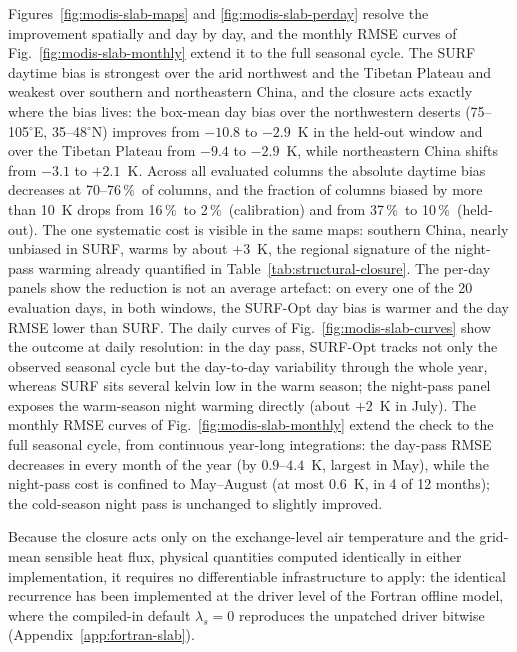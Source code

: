 Figures~\ref{fig:modis-slab-maps} and \ref{fig:modis-slab-perday} resolve
the improvement spatially and day by day, and the monthly RMSE curves of
Fig.~\ref{fig:modis-slab-monthly} extend it to the full seasonal cycle. The
SURF daytime bias is strongest over the arid northwest and the Tibetan
Plateau and weakest over southern and northeastern China, and the closure
acts exactly where the bias lives: the box-mean day bias over the
northwestern deserts (75--105$^\circ$E, 35--48$^\circ$N) improves from
$-10.8$ to $-2.9$~K in the held-out window and over the Tibetan Plateau from
$-9.4$ to $-2.9$~K, while northeastern China shifts from $-3.1$ to
$+2.1$~K. Across all evaluated columns the absolute daytime bias
decreases at 70--76\,\%~of columns, and the fraction of columns biased by
more than 10~K drops from 16\,\%~to 2\,\%~(calibration) and from
37\,\%~to 10\,\%~(held-out). The one systematic cost is visible in the same
maps: southern China, nearly unbiased in SURF, warms by about $+3$~K,
the regional signature of the night-pass warming already quantified in
Table~\ref{tab:structural-closure}. The per-day panels show the reduction is
not an average artefact: on every one of the 20 evaluation days, in both
windows, the SURF-Opt day bias is warmer and the day RMSE lower than
SURF. The daily curves of
Fig.~\ref{fig:modis-slab-curves} show the outcome at daily resolution: in the
day pass, SURF-Opt tracks not only the observed seasonal cycle but the
day-to-day variability through the whole year, whereas SURF sits several
kelvin low in the warm season; the night-pass panel exposes the warm-season
night warming directly (about
$+2$~K in July). The monthly RMSE curves of Fig.~\ref{fig:modis-slab-monthly} extend
the check to the full seasonal cycle, from continuous year-long integrations:
the day-pass RMSE decreases in every month of the year (by $0.9$--$4.4$~K,
largest in May), while the night-pass cost is confined to May--August (at
most $0.6$~K, in 4 of 12 months); the cold-season night pass is unchanged
to slightly improved.

Because the closure acts only on the exchange-level air temperature and the
grid-mean sensible heat flux, physical quantities computed identically in
either implementation, it requires no differentiable infrastructure to
apply: the identical recurrence has been implemented at
the driver level of the Fortran offline model, where the compiled-in default
$\lambda_s = 0$ reproduces the unpatched driver bitwise
(Appendix~\ref{app:fortran-slab}).

